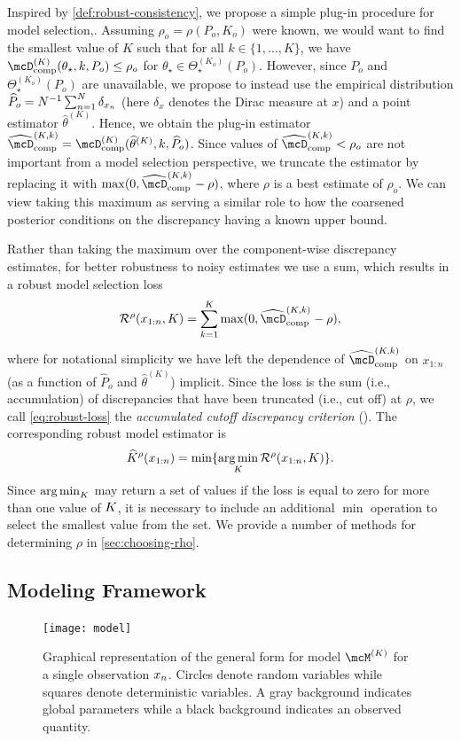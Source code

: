 Inspired by \cref{def:robust-consistency}, we propose a simple plug-in procedure for model selection,.
Assuming $\rho_o = \rho(P_o, K_o)$ were known, we would want to find the smallest value of $K$ such that 
for all $k \in \{1,\dots,K\}$, we have $\compDisc^{(K)}(\theta_\star, k, P_{o}) \le \rho_o$ for $\theta_\star \in \Theta_{\star}^{(K_{o})}(P_{o})$.
However, since $P_{o}$ and $\Theta_{\star}^{(K_{o})}(P_{o})$ are unavailable, we propose to instead 
use the empirical distribution $\widehat{P}_o = N^{-1} \sum_{n=1}^N \delta_{x_n}$ (here $\delta_x$ denotes
the Dirac measure at $x$) and a point estimator $\widehat\theta^{(K)}$.
Hence, we obtain the plug-in estimator $\compDiscEst^{(K,k)} = \compDisc^{(K)}(\widehat\theta^{(K)}, k, \widehat{P}_o)$.
Since values of $\compDiscEst^{(K,k)} < \rho_o$ are not important from a model selection perspective, 
we truncate the estimator by replacing it with $\max(0, \compDiscEst^{(K,k)} - \rho)$, where $\rho$ is 
a best estimate of $\rho_o$. 
We can view taking this maximum as serving a similar role to how the coarsened posterior conditions on the discrepancy having a known upper bound. 

Rather than taking the maximum over the component-wise discrepancy estimates, for better robustness
to noisy estimates we use a sum, which results in a robust model selection loss 
\[ \label{eq:robust-loss}
	\mathcal{R}^\rho(x_{1:n}, K) = \sum_{k=1}^K \max(0, \compDiscEst^{(K,k)} - \rho),
\]
where for notational simplicity we have left the dependence of $\compDiscEst^{(K,k)}$ on $x_{1:n}$ 
(as a function of $\widehat{P}_o$ and $\widehat\theta^{(K)}$) implicit. 
Since the loss is the sum (i.e., accumulation) of discrepancies that have been truncated (i.e., cut off) at $\rho$,
we call \cref{eq:robust-loss} the \emph{accumulated cutoff discrepancy criterion} (\methodname).
The corresponding robust model estimator is
\[
\widehat{K}^\rho(x_{1:n}) = \min\{\argmin_K \mathcal{R}^\rho(x_{1:n}, K)\}.
\]
Since $\argmin_{\numcomps}$ may return a set of values if the loss is equal to
zero for more than one value of $K$, it is necessary to include an
additional $\min$ operation to select the smallest value from the set.
We provide a number of methods for determining $\rho$ in \cref{sec:choosing-rho}. 

\subsection{Modeling Framework} \label{sec:framework}

\begin{figure}[tp]
	\centering
	\texttt{[image: model]}
	\caption{Graphical representation of the general form for model $\model{K}$ for a single observation $x_{n}$.
		Circles denote random variables while squares denote deterministic variables.
		A gray background indicates global parameters while a black background indicates an observed quantity.}
	\label{fig:model}
\end{figure}


